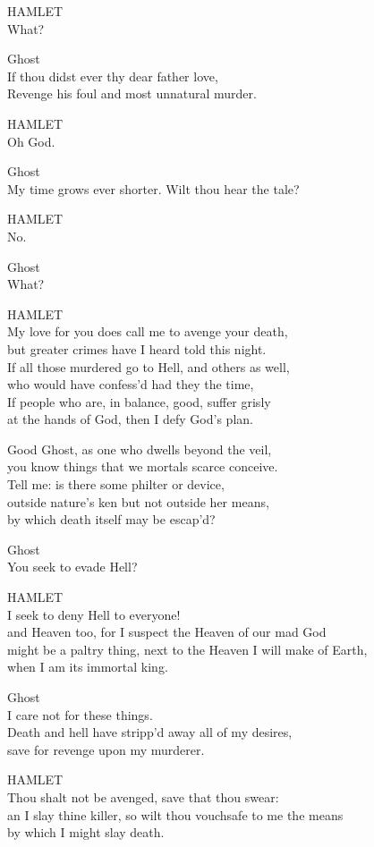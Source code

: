 HAMLET\\
What?

Ghost\\
If thou didst ever thy dear father love,\\
Revenge his foul and most unnatural murder.

HAMLET\\
Oh God.

Ghost\\
My time grows ever shorter. Wilt thou hear the tale?

HAMLET\\
No.

Ghost\\
What?

HAMLET\\
My love for you does call me to avenge your death,\\
but greater crimes have I heard told this night.\\
If all those murdered go to Hell, and others as well,\\
who would have confess'd had they the time,\\
If people who are, in balance, good, suffer grisly\\
at the hands of God, then I defy God's plan.

Good Ghost, as one who dwells beyond the veil,\\
you know things that we mortals scarce conceive.\\
Tell me: is there some philter or device,\\
outside nature's ken but not outside her means,\\
by which death itself may be escap'd?

Ghost\\
You seek to evade Hell?

HAMLET\\
I seek to deny Hell to everyone!\\
and Heaven too, for I suspect the Heaven of our mad God\\
might be a paltry thing, next to the Heaven I will make of Earth,\\
when I am its immortal king.

Ghost\\
I care not for these things.\\
Death and hell have stripp'd away all of my desires,\\
save for revenge upon my murderer.

HAMLET\\
Thou shalt not be avenged, save that thou swear:\\
an I slay thine killer, so wilt thou vouchsafe to me the means\\
by which I might slay death.

